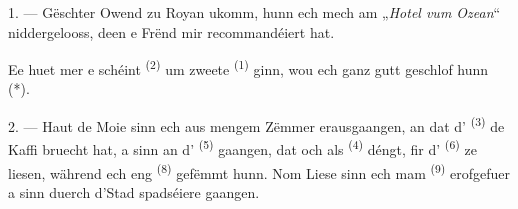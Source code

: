 %
%
%
%


\VUsaut{3.0mm}
\VUsaut{1.6mm}
\VUsaut{2.0mm}
\VUsaut{3.4mm}

1. --- Gëschter Owend zu Royan ukomm, hunn ech mech am „\textit{Hotel vum Ozean}“
niddergelooss, deen e Frënd mir recommandéiert hat.

Ee huet mer e schéint  \textsuperscript{(2)} um zweete
 \textsuperscript{(1)} ginn, wou ech ganz gutt geschlof hunn (*).

2. --- Haut de Moie sinn ech aus mengem Zëmmer erausgaangen, an dat
d' \textsuperscript{(3)} de Kaffi bruecht hat, a sinn an
d' \textsuperscript{(5)} gaangen, dat och als 
\textsuperscript{(4)} déngt, fir d' \textsuperscript{(6)} ze
liesen, während ech eng  \textsuperscript{(8)} gefëmmt hunn. Nom
Liese sinn ech mam  \textsuperscript{(9)} erofgefuer a sinn duerch
d'Stad spadséiere gaangen.

